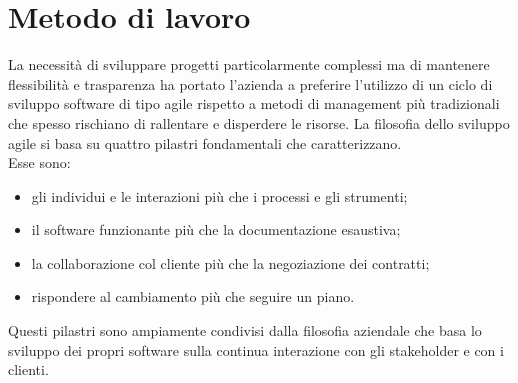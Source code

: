 \section{Metodo di lavoro}
La necessità di sviluppare progetti particolarmente complessi ma di mantenere flessibilità e trasparenza ha portato l'azienda a preferire l'utilizzo di un ciclo di sviluppo software di tipo agile rispetto a metodi di management più tradizionali che spesso rischiano di rallentare e disperdere le risorse.
La filosofia dello sviluppo agile si basa su quattro pilastri fondamentali che caratterizzano. \\ Esse sono:
\begin{itemize}
	\item gli individui e le interazioni più che i processi e gli strumenti;
	\item  il software funzionante più che la documentazione esaustiva;
	\item la collaborazione col cliente più che la negoziazione dei contratti;
	\item  rispondere al cambiamento più che seguire un piano.
\end{itemize}
Questi pilastri sono ampiamente condivisi dalla filosofia aziendale che basa lo sviluppo dei propri software sulla continua interazione con gli stakeholder e con i clienti.

